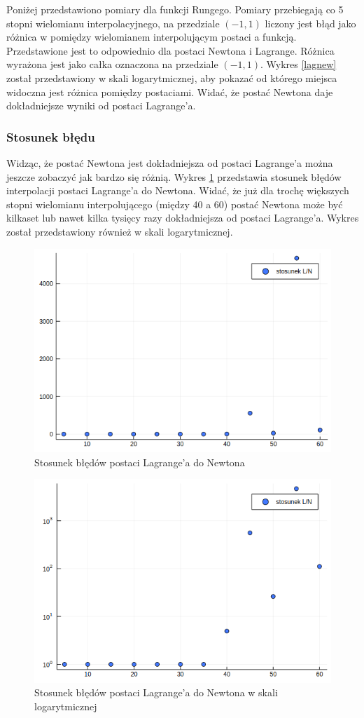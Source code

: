 \documentclass[paper=a4, fontsize=11pt]{scrartcl} %
\numberwithin{equation}{section} %
\numberwithin{figure}{section} %
\numberwithin{table}{section} %
\begin{document}
Poniżej przedstawiono pomiary dla funkcji Rungego. Pomiary przebiegają
co 5 stopni wielomianu interpolacyjnego, na przedziale $(-1,1)$ liczony jest błąd
jako różnica w pomiędzy wielomianem interpolującym postaci a funkcją.
Przedstawione jest to odpowiednio dla postaci Newtona i Lagrange. 
Różnica wyrażona jest jako całka oznaczona na przedziale $(-1,1)$.
Wykres \ref{lagnew} został przedstawiony w skali logarytmicznej, aby pokazać od którego miejsca
widoczna jest różnica pomiędzy postaciami.
Widać, że postać Newtona daje dokładniejsze wyniki od postaci Lagrange'a.

\subsubsection{Stosunek błędu}
Widząc, że postać Newtona jest dokładniejsza od postaci Lagrange'a można jeszcze zobaczyć jak bardzo się różnią.
Wykres \ref{stos} przedstawia stosunek błędów interpolacji postaci Lagrange'a do Newtona. Widać, że
już dla trochę większych stopni wielomianu interpolującego (między 40 a 60) postać Newtona może być kilkaset lub nawet
kilka tysięcy razy dokładniejsza od postaci Lagrange'a. Wykres został przedstawiony również w skali logarytmicznej.
\begin{figure}[h!]
  \includegraphics[width=120mm]{stosunek.png}
  \caption{Stosunek błędów postaci Lagrange'a do Newtona}
  \label{stos}
\end{figure} 
\begin{figure}[h!]
  \includegraphics[width=120mm]{stosunek_log.png}
  \caption{Stosunek błędów postaci Lagrange'a do Newtona w skali logarytmicznej}
  \label{stos_log}
\end{figure} 
\end{document}
